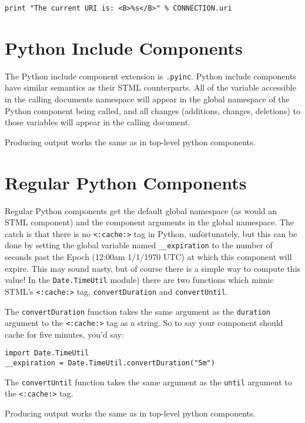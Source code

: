 \documentclass{manual}
\begin{document}
\begin{verbatim}
print "The current URI is: <B>%s</B>" % CONNECTION.uri
\end{verbatim}




\section{Python Include Components}
\label{pythonincl}
The Python include component extension is \texttt{.pyinc}.
Python include components have similar semantics as their STML
counterparts.  All of the variable accessible in the calling documents
namespace will appear in the global namespace of the Python component
being called, and all changes (additions, changes, deletions) to those
variables will appear in the calling document.  

Producing output works the same as in top-level python components.




\section{Regular Python Components}
\label{pythonreg}
Regular Python components get the default global namespace (as would
an STML component) and the component arguments in the global
namespace.  The catch is that there is no \texttt{<:cache:>} tag
in Python,  unfortunately, but this can be done by setting the global variable
named \texttt{__expiration} to the number of seconds past the Epoch
(12:00am 1/1/1970 UTC) at which this component will expire.  This may sound
nasty, but of course there is a simple way to compute this value!  In
the \texttt{Date.TimeUtil} module) there are two functions which mimic STML's
\texttt{<:cache:>} tag, \texttt{convertDuration} and
\texttt{convertUntil}. 

The \texttt{convertDuration} function takes the same argument as the
\texttt{duration} argument to the \texttt{<:cache:>} tag as a string.  So
to say your component should cache for five minutes, you'd say:

\begin{verbatim}
import Date.TimeUtil
__expiration = Date.TimeUtil.convertDuration("5m")
\end{verbatim}


The \texttt{convertUntil} function takes the same argument as the
\texttt{until} argument to the \texttt{<:cache:>} tag.

Producing output works the same as in top-level python components.
\end{document}
